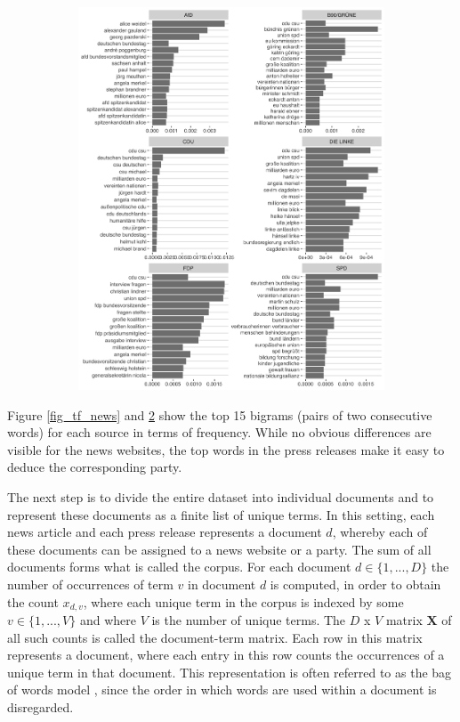 \documentclass[12pt,a4paper,notitlepage]{article}
\begin{document}
\begin{figure}[H]
\begin{center}
\begin{subfigure}[normla]{0.38\textwidth}
			\includegraphics[width=\textwidth]{../figs/tf_bigrams_press}
			\label{fig_tf_press}
		\end{subfigure}
	\end{center}
\end{figure}

Figure \ref{fig_tf_news} and \ref{fig_tf_press} show the top 15 bigrams (pairs of two consecutive words) for each source in terms of frequency. While no obvious differences are visible for the news websites, the top words in the press releases make it easy to deduce the corresponding party. 

The next step is to divide the entire dataset into individual documents and to represent these documents as a finite list of unique terms. In this setting, each news article and each press release represents a document $d$, whereby each of these documents can be assigned to a news website or a party. The sum of all documents forms what is called the corpus. For each document $d \in \lbrace 1,...,D \rbrace$ the number of occurrences of term $v$ in document $d$ is computed, in order to obtain the count $x_{d,v}$, where each unique term in the corpus is indexed by some $v \in \lbrace 1,...,V \rbrace$ and where $V$ is the number of unique terms. The $D$ x $V$ matrix $\boldsymbol{X}$ of all such counts is called the document-term matrix. Each row in this matrix represents a document, where each entry in this row counts the occurrences of a unique term in that document. This representation is often referred to as the bag of words model \citep{gentzkow_text_2017}, since the order in which words are used within a document is disregarded.
\end{document}
